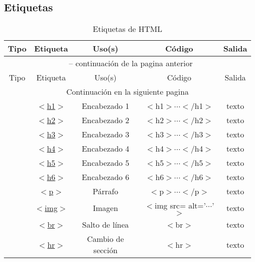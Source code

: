 \documentclass[12pt]{report}
\begin{document}
		\subsection{Etiquetas}
			\begin{longtable}{c >{\ttfamily} c c >{\ttfamily} c c}
				\caption{Etiquetas de HTML}\\
				Tipo	&	Etiqueta	&	Uso(s)	&	Código	&	Salida \\\hline
				\endfirsthead
				\multicolumn{5}{c}{\tablename\ \thetable{} -- continuación de la pagina anterior}\\
				Tipo	&	Etiqueta	&	Uso(s)	&	Código	&	Salida	\\\hline
				\multicolumn{5}{c}{Continuación en la siguiente pagina}\\\hline
				\endfoot
				\endlastfoot
				\multirow{7}{*}{\rotatebox[origin=c]{90}{De texto}}
					&	\href{https://developer.mozilla.org/es/docs/Web/HTML/Element/Heading_Elements}{$<$h1$>$}
						&	Encabezado 1	&	$<$h1$>\cdots<$/h1$>$		&	texto	\\
					&	\href{https://developer.mozilla.org/es/docs/Web/HTML/Element/Heading_Elements}{$<$h2$>$}
						&	Encabezado 2	& $<$h2$>\cdots<$/h2$>$		&	texto	\\
					&	\href{https://developer.mozilla.org/es/docs/Web/HTML/Element/Heading_Elements}{$<$h3$>$}
						&	Encabezado 3	& $<$h3$>\cdots<$/h3$>$		&	texto	\\
					&	\href{https://developer.mozilla.org/es/docs/Web/HTML/Element/Heading_Elements}{$<$h4$>$}
						&	Encabezado 4	& $<$h4$>\cdots<$/h4$>$		&	texto	\\
					&	\href{https://developer.mozilla.org/es/docs/Web/HTML/Element/Heading_Elements}{$<$h5$>$}
						&	Encabezado 5	& $<$h5$>\cdots<$/h5$>$		&	texto	\\
					&	\href{https://developer.mozilla.org/es/docs/Web/HTML/Element/Heading_Elements}{$<$h6$>$}
						&	Encabezado 6	& $<$h6$>\cdots<$/h6$>$		&	texto	\\
					&	\href{https://developer.mozilla.org/es/docs/Web/HTML/Element/p}{$<$p$>$}
						&	Párrafo				&	$<$p$>\cdots<$/p$>$	&	texto	\\
				\multirow{3}{*}{\rotatebox[origin=c]{90}{Vacíos}}
					&	\href{https://developer.mozilla.org/es/docs/Web/HTML/Element/img}{$<$img$>$}
						&	Imagen						&	$<$img src=\say{$\cdots$} alt='$\cdots$' $>$	&	texto	\\
					&	\href{https://developer.mozilla.org/es/docs/Web/HTML/Element/br}{$<$br$>$}
						&	Salto de línea		&	$<$br$>$																	&	texto	\\
					&	\href{https://developer.mozilla.org/es/docs/Web/HTML/Element/hr}{$<$hr$>$}
						&	Cambio de sección	&	$<$hr$>$	&	texto	\\
			\end{longtable}
\end{document}
